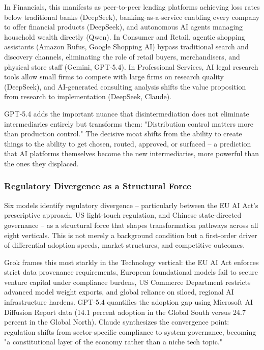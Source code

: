 \documentclass[preprint,review,12pt]{elsarticle}
\begin{document}
In Financials, this manifests as peer-to-peer lending platforms achieving loss rates below traditional banks (DeepSeek), banking-as-a-service enabling every company to offer financial products (DeepSeek), and autonomous AI agents managing household wealth directly (Qwen). In Consumer and Retail, agentic shopping assistants (Amazon Rufus, Google Shopping AI) bypass traditional search and discovery channels, eliminating the role of retail buyers, merchandisers, and physical store staff (Gemini, GPT-5.4). In Professional Services, AI legal research tools allow small firms to compete with large firms on research quality (DeepSeek), and AI-generated consulting analysis shifts the value proposition from research to implementation (DeepSeek, Claude).

GPT-5.4 adds the important nuance that disintermediation does not eliminate intermediaries entirely but transforms them: "Distribution control matters more than production control." The decisive moat shifts from the ability to create things to the ability to get chosen, routed, approved, or surfaced -- a prediction that AI platforms themselves become the new intermediaries, more powerful than the ones they displaced.


\subsubsection{Regulatory Divergence as a Structural Force}
\label{sec:regulatory_divergence}

Six models identify regulatory divergence -- particularly between the EU AI Act's prescriptive approach, US light-touch regulation, and Chinese state-directed governance -- as a structural force that shapes transformation pathways across all eight verticals. This is not merely a background condition but a first-order driver of differential adoption speeds, market structures, and competitive outcomes.

Grok frames this most starkly in the Technology vertical: the EU AI Act enforces strict data provenance requirements, European foundational models fail to secure venture capital under compliance burdens, US Commerce Department restricts advanced model weight exports, and global reliance on siloed, regional AI infrastructure hardens. GPT-5.4 quantifies the adoption gap using Microsoft AI Diffusion Report data (14.1 percent adoption in the Global South versus 24.7 percent in the Global North). Claude synthesizes the convergence point: regulation shifts from sector-specific compliance to system-governance, becoming "a constitutional layer of the economy rather than a niche tech topic."
\end{document}
